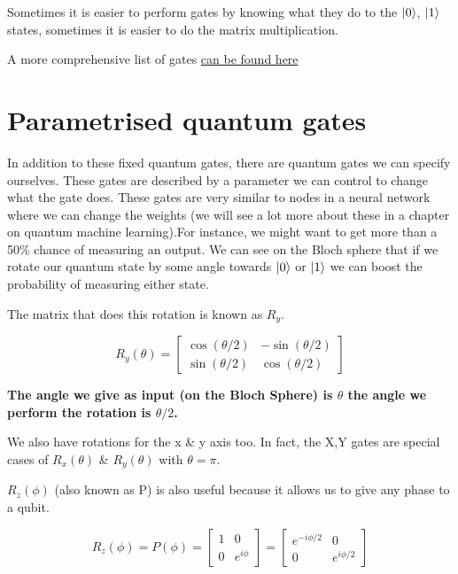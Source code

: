 Sometimes it is easier to perform gates by knowing what they do to the $\ket{0}$, $\ket{1}$ states, sometimes it is easier to do the matrix multiplication. 

A more comprehensive list of gates \href{https://raw.githubusercontent.com/qiskit-community/qiskit-textbook/main/content/ch-states/supplements/single-gates-cheatsheet.pdf}{can be found here}

\section{Parametrised quantum gates }

In addition to these fixed quantum gates, there are quantum gates we can specify ourselves. These gates are described by a parameter we can control to change what the gate does. These gates are very similar to nodes in a neural network where we can change the weights (we will see a lot more about these in a chapter on quantum machine learning).For instance, we might want to get more than a 50\% chance of measuring an output. We can see on the Bloch sphere that if we rotate our quantum state by some angle towards $\ket{0}$ or $\ket{1}$ we can boost the probability of measuring either state.


The matrix that does this rotation is known as $R_y$.

$$
R_y(\theta) = \begin{bmatrix} \cos(\theta /2) & -\sin(\theta /2) \\ \sin(\theta /2) & \cos(\theta /2) \end{bmatrix}
$$

\textbf{The angle we give as input (on the Bloch Sphere) is $\theta$ the angle we perform the rotation is $\theta/2$.}

We also have rotations for the x \& y axis too. In fact, the X,Y gates are special cases of $R_x(\theta)$ \& $R_y(\theta)$ with $\theta = \pi$. 

$R_z(\phi)$ (also known as P) is also useful because it allows us to give any phase to a qubit. 

$$
R_z(\phi) = P(\phi) = \begin{bmatrix} 1 & 0 \\ 0 & e^{i\phi} \end{bmatrix} = \begin{bmatrix} e^{-i\phi/2} & 0 \\ 0 & e^{i\phi/2} \end{bmatrix}
$$

